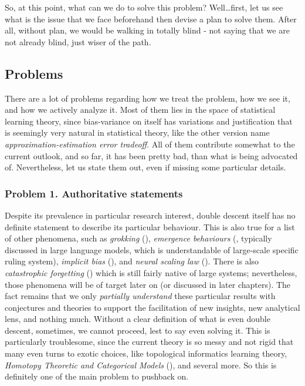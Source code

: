 So, at this point, what can we do to solve this problem? Well\dots first, let us see what is the issue that we face beforehand then devise a plan to solve them. After all, without plan, we would be walking in totally blind - not saying that we are not already blind, just wiser of the path. 

\subsection{Problems}
There are a lot of problems regarding how we treat the problem, how we see it, and how we actively analyze it. Most of them lies in the space of statistical learning theory, since bias-variance on itself has variations and justification that is seemingly very natural in statistical theory, like the other version name \textit{approximation-estimation error tradeoff}. All of them contribute somewhat to the current outlook, and so far, it has been pretty bad, than what is being advocated of. Nevertheless, let us state them out, even if missing some particular details. 

\subsubsection*{Problem 1. Authoritative statements}
Despite its prevalence in particular research interest, double descent itself has no definite statement to describe its particular behaviour. This is also true for a list of other phenomena, such as \textit{grokking} (\cite{power2022grokkinggeneralizationoverfittingsmall}), \textit{emergence behaviours} (\cite{wei2022emergentabilitieslargelanguage}, typically discussed in large language models, which is understandable of large-scale specific ruling system), \textit{implicit bias} (\cite{soudry2024implicitbiasgradientdescent}), and \textit{neural scaling law} (\cite{kaplan2020scalinglawsneurallanguage,wei2022emergentabilitieslargelanguage}). There is also \textit{catastrophic forgetting} (\cite{vandeven2024continuallearningcatastrophicforgetting}) which is still fairly native of large systems; nevertheless, those phenomena will be of target later on (or discussed in later chapters). The fact remains that we only \textit{partially understand} these particular results with conjectures and theories to support the facilitation of new insights, new analytical lens, and nothing much. Without a clear definition of what is even double descent, sometimes, we cannot proceed, lest to say even solving it. This is particularly troublesome, since the current theory is so messy and not rigid that many even turns to exotic choices, like topological informatics learning theory, \textit{Homotopy Theoretic and Categorical Models} (\cite{Manin_2024}), and several more. So this is definitely one of the main problem to pushback on. 


